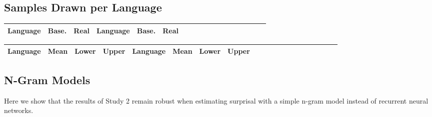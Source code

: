 \documentclass[11pt,letterpaper]{article}
\begin{document}






\subsection{Samples Drawn per Language}

\begin{center}
\begin{longtable}{l|ll||l|llllllllllllll}
	Language & Base. & Real & Language & Base. & Real \\ \hline

\end{longtable}
	\label{tab:samples}
\end{center}



\begin{center}
\begin{longtable}{l|lll||l|lllllllllllllll}
	Language & Mean & Lower & Upper & Language & Mean & Lower & Upper \\ \hline

\end{longtable}
	\label{tab:boot-g}
\end{center}




\subsection{N-Gram Models}


Here we show that the results of Study 2 remain robust when estimating surprisal with a simple n-gram model instead of recurrent neural networks.
\end{document}
